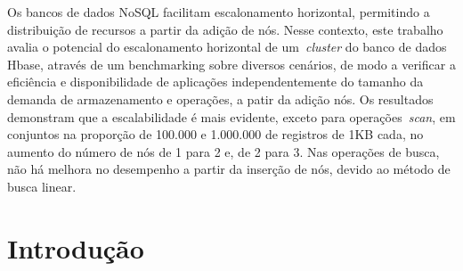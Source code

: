 \documentclass[12pt]{article}
\begin{document}
\begin{resumo} 
Os bancos de dados NoSQL facilitam escalonamento horizontal, permitindo a distribuição de recursos a partir da adição de nós. Nesse contexto, este trabalho avalia o potencial do escalonamento horizontal de um~\emph{cluster}  do banco de dados Hbase, através de um benchmarking sobre diversos cenários, de modo a verificar a eficiência e disponibilidade de aplicações independentemente do tamanho da demanda de armazenamento e operações, a patir da adição nós. Os resultados demonstram que a escalabilidade é mais evidente, exceto para operações~\emph{scan}, em conjuntos na proporção de 100.000 e 1.000.000 de registros de 1KB cada, no aumento do número de nós de 1 para 2 e, de 2 para 3. Nas operações de busca, não há melhora no desempenho a partir da inserção de nós, devido ao método de busca linear.
\end{resumo}


\section{Introdução}
\label{sec:introducao}
\end{document}
